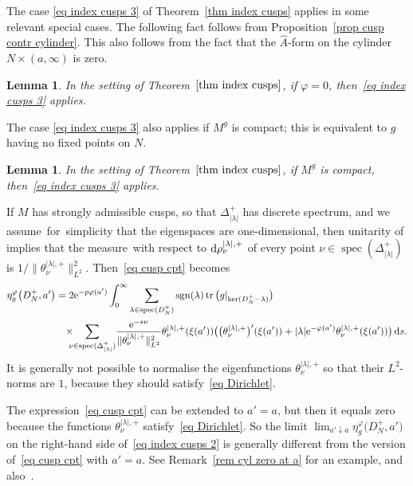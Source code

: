 \documentclass[pdftex]{sigma}%
\numberwithin{equation}{section}
\newtheorem{Lemma}[Theorem]{Lemma}
\DeclareMathOperator{\tr}{tr}
\DeclareMathOperator{\spec}{spec}
\DeclareMathOperator{\sgn}{sgn}
\newcommand{\cF}{\mathcal{F}}
\begin{document}
The case \eqref{eq index cusps 3} of Theorem~\ref{thm index cusps} applies in some relevant special cases. The following fact follows from Proposition~\ref{prop cusp contr cylinder}. This also follows from the fact that the $\hat A$-form on the cylinder $N \times (a, \infty)$ is zero.

\begin{Lemma}%
In the setting of Theorem~$\ref{thm index cusps}$,
if $\varphi = 0$, then~\eqref{eq index cusps 3} applies.
\end{Lemma}

The case \eqref{eq index cusps 3} also applies if $M^g$ is compact; this is equivalent to $g$ having no fixed points on $N$.
\begin{Lemma}In the setting of Theorem~$\ref{thm index cusps}$, if $M^g$ is compact, then~\eqref{eq index cusps 3} applies.
\end{Lemma}
If $M$ has strongly admissible cusps, so that $\Delta_{|\lambda|}^+$ has discrete spectrum, and we assume~for~sim\-plicity that the eigenspaces are one-dimensional, then unitarity of \smash{$\cF_{q_{|\lambda|}^+}$} implies that the measure~with respect to ${\rm d}\rho_{\nu}^{|\lambda|, +}$ of every point $\nu \in \spec(\Delta_{|\lambda|}^+)$ is $1/\|\theta_{\nu}^{|\lambda|, +}\|_{L^2}^{2}$. Then~\eqref{eq cusp cpt} becomes
\begin{align*}%
\eta^{\varphi}_g\big(D_N^+, a'\big) &=
2 {\rm e}^{-p\varphi(a')}
 \int_{0}^{\infty}
\sum_{\lambda \in \spec(D_N^+)}\sgn(\lambda) \tr\big(g|_{\ker(D_N^+ - \lambda)}\big)
\\
&\phantom{=}\times\!\!\!\!\sum_{\nu \in \spec(\Delta_{|\lambda|}^+)}\!
\frac{{\rm e}^{-s\nu}}{\|\theta_{\nu}^{|\lambda|, +}\|_{L^2}^2}
\theta^{|\lambda|, +}_{\nu} (\xi(a'))
 \big( \big(\theta^{|\lambda|, +}_{\nu} \big)'(\xi(a')) +|\lambda| {\rm e}^{-\varphi(a')} \theta^{|\lambda|, +}_{\nu} (\xi(a')) \big) \, {\rm d}s.
\end{align*}
It is generally not possible to normalise the eigenfunctions $\theta_{\nu}^{|\lambda|, +}$ so that their $L^2$-norms are $1$, because they should satisfy~\eqref{eq Dirichlet}.

\begin{Remark}
The expression~\eqref{eq cusp cpt} can be extended to $a' = a$, but then it equals zero because the functions $\theta_{\nu}^{|\lambda|, +}$ satisfy~\eqref{eq Dirichlet}. So the limit $\lim_{a' \downarrow a} \eta_g^{\varphi}\big(D_N^+,a'\big)$ on the right-hand side of~\eqref{eq index cusps 2} is generally different from the version of~\eqref{eq cusp cpt} with $a' = a$. See Remark~\ref{rem cyl zero at a} for an example, and also~\cite[Remarks~2.4 and~5.12]{HW21a}.
\end{Remark}
\end{document}
